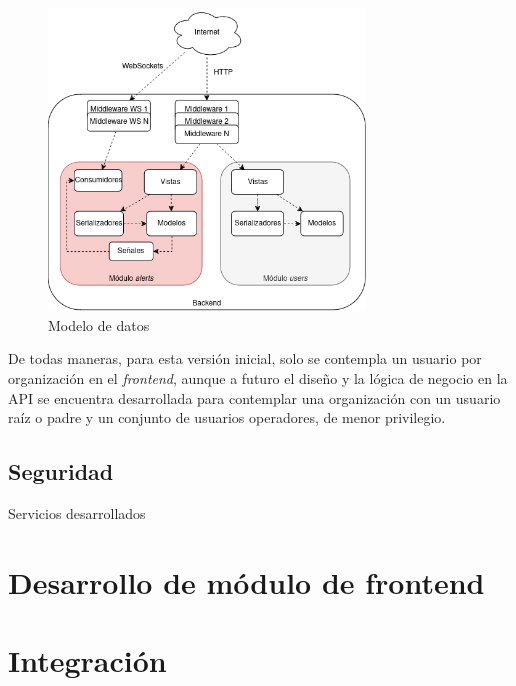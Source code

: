 {\begin{figure}[H]
	\centering
	\includegraphics[width=0.75\textwidth]{./Figures/backend-modelos.png}
	\caption{Modelo de datos}
	\label{backend:modelo}
\end{figure}

De todas maneras, para esta versión inicial, solo se contempla un usuario por organización en el \textit{frontend}, aunque a futuro el diseño y la lógica de negocio en la API se encuentra desarrollada para contemplar una organización con un usuario raíz o padre y un conjunto de usuarios operadores, de menor privilegio.

\subsection{Seguridad}


Servicios desarrollados

\section{Desarrollo de módulo de frontend}

\section{Integración}}
